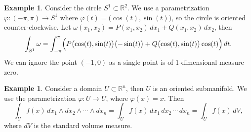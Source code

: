 \documentclass[12pt,openany]{book}
\newcommand{\R}{{\mathbb{R}}}
\theoremstyle{plain}
\theoremstyle{remark}
\theoremstyle{definition}
\theoremstyle{exercise}
\theoremstyle{example}
\newtheorem{example}[thm]{Example}
\begin{document}
\begin{example} \label{example:diffformscircleint}
Consider the circle $S^1 \subset
\R^2$.  We use a parametrization $\varphi \colon (-\pi,\pi) \to S^1$
where $\varphi(t) = \bigl(\cos(t),\sin(t)\bigr)$, so the circle is oriented
counter-clockwise.
Let $\omega(x_1,x_2) = P(x_1,x_2) \, dx_1 + Q(x_1,x_2) \, dx_2$, then
\begin{equation*}
\int_{S^1} \omega =
\int_{-\pi}^{\pi}
\Bigl(
P\bigl(\cos(t),\sin(t)\bigr) \bigl(-\sin(t)\bigr)  +
Q\bigl(\cos(t),\sin(t)\bigr) \cos(t) \Bigr) \, dt .
\end{equation*}
We can ignore the point $(-1,0)$ as a single point is of $1$-dimensional
measure zero.
\end{example}

\begin{example}
Consider a domain $U \subset \R^n$, then $U$ is an oriented submanifold.
We use the parametrization $\varphi \colon U \to U$, where $\varphi(x) =
x$.  Then
\begin{equation*}
\int_U f(x) \, dx_1 \wedge dx_2 \wedge \cdots \wedge dx_n
=
\int_U f(x) \, dx_1 \, dx_2 \,  \cdots \, dx_n
=
\int_U f(x) \, dV ,
\end{equation*}
where $dV$ is the standard volume measure.
\end{example}
\end{document}
